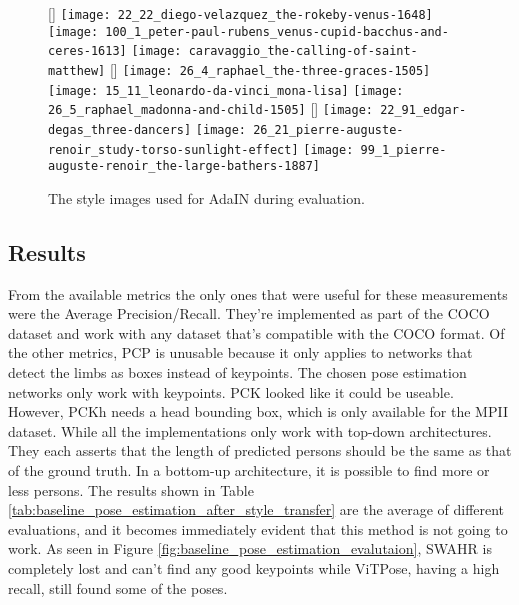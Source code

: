 \begin{figure}[h]
    \centering
	[\textwidth]{
		\texttt{[image: 22\_22\_diego-velazquez\_the-rokeby-venus-1648]}
		\texttt{[image: 100\_1\_peter-paul-rubens\_venus-cupid-bacchus-and-ceres-1613]}
		\texttt{[image: caravaggio\_the-calling-of-saint-matthew]}
	}
	[\textwidth]{
        \texttt{[image: 26\_4\_raphael\_the-three-graces-1505]}
        \texttt{[image: 15\_11\_leonardo-da-vinci\_mona-lisa]}
        \texttt{[image: 26\_5\_raphael\_madonna-and-child-1505]}
	}
	[\textwidth]{
        \texttt{[image: 22\_91\_edgar-degas\_three-dancers]}
        \texttt{[image: 26\_21\_pierre-auguste-renoir\_study-torso-sunlight-effect]}
        \texttt{[image: 99\_1\_pierre-auguste-renoir\_the-large-bathers-1887]}
	}
	\caption{
        The style images used for AdaIN during evaluation.
    }
    \label{fig:baseline_style_images_adain_evaluation}
\end{figure}

\subsection{Results}
\label{sec:baseline_results_coco_style_transfer}
From the available metrics the only ones that were useful for these measurements were the Average Precision/Recall.
They're implemented as part of the COCO dataset and work with any dataset that's compatible with the COCO format.
Of the other metrics, \gls{PCP} is unusable because it only applies to networks that detect the limbs as boxes instead of keypoints.
The chosen pose estimation networks only work with keypoints.
\gls{PCK} looked like it could be useable. However, PCKh needs a head bounding box, which is only available for the MPII dataset.
While all the implementations only work with top-down architectures.
They each asserts that the length of predicted persons should be the same as that of the ground truth.
In a bottom-up architecture, it is possible to find more or less persons.
The results shown in Table \ref{tab:baseline_pose_estimation_after_style_transfer} are the average of different evaluations, and it becomes immediately evident that this method is not going to work.
As seen in Figure \ref{fig:baseline_pose_estimation_evalutaion}, SWAHR is completely lost and can't find any good keypoints while ViTPose, having a high recall, still found some of the poses. 

